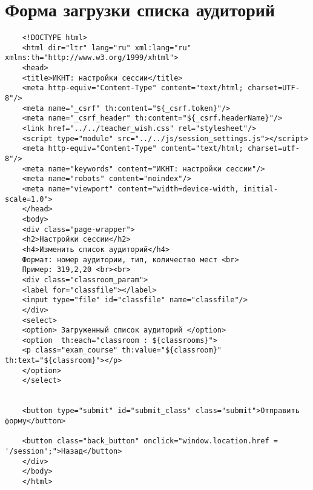 \chapter{Форма загрузки списка аудиторий}\label{appendix-room}	

\begin{lstlisting}
	<!DOCTYPE html>
	<html dir="ltr" lang="ru" xml:lang="ru" xmlns:th="http://www.w3.org/1999/xhtml">
	<head>
	<title>ИКНТ: настройки сессии</title>
	<meta http-equiv="Content-Type" content="text/html; charset=UTF-8"/>
	<meta name="_csrf" th:content="${_csrf.token}"/>
	<meta name="_csrf_header" th:content="${_csrf.headerName}"/>
	<link href="../../teacher_wish.css" rel="stylesheet"/>
	<script type="module" src="../../js/session_settings.js"></script>
	<meta http-equiv="Content-Type" content="text/html; charset=utf-8"/>
	<meta name="keywords" content="ИКНТ: настройки сессии"/>
	<meta name="robots" content="noindex"/>
	<meta name="viewport" content="width=device-width, initial-scale=1.0">
	</head>
	<body>
	<div class="page-wrapper">
	<h2>Настройки сессии</h2>
	<h4>Изменить список аудиторий</h4>
	Формат: номер аудитории, тип, количество мест <br>
	Пример: 319,2,20 <br><br>
	<div class="classroom_param">
	<label for="classfile"></label>
	<input type="file" id="classfile" name="classfile"/>
	</div>
	<select>
	<option> Загруженный список аудиторий </option>
	<option  th:each="classroom : ${classrooms}">
	<p class="exam_course" th:value="${classroom}" th:text="${classroom}"></p>
	</option>
	</select>
	
	
	<button type="submit" id="submit_class" class="submit">Отправить форму</button>
	
	<button class="back_button" onclick="window.location.href = '/session';">Назад</button>
	</div>
	</body>
	</html>
\end{lstlisting}